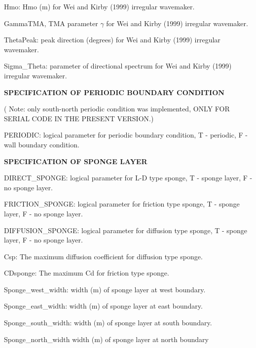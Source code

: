 \documentclass[11pt]{article}
\begin{document}
\begin{description}
\item Hmo: Hmo (m) for Wei and Kirby (1999) irregular wavemaker.

\item GammaTMA, TMA parameter $\gamma$ for Wei and Kirby (1999) irregular wavemaker.

\item ThetaPeak: peak direction (degrees) for Wei and Kirby (1999) irregular wavemaker. 

\item Sigma\_Theta: parameter of directional spectrum for Wei and Kirby (1999) irregular wavemaker.

\item {\bf SPECIFICATION OF PERIODIC BOUNDARY CONDITION} 

( Note: only south-north periodic condition was implemented, ONLY FOR SERIAL CODE IN THE PRESENT VERSION.)

\item PERIODIC: logical parameter for periodic boundary condition, T - periodic, F - wall boundary condition.


\item {\bf SPECIFICATION OF SPONGE LAYER} 
 
 \item DIRECT\_SPONGE: logical parameter for L-D type sponge, T - sponge layer, F - no sponge layer.
 
  \item FRICTION\_SPONGE: logical parameter for friction type sponge, T - sponge layer, F - no sponge layer.
 
  \item DIFFUSION\_SPONGE: logical parameter for diffusion type sponge, T - sponge layer, F - no sponge layer.
 
 \item Csp: The maximum diffusion coefficient for diffusion type sponge.
 
 \item CDsponge: The maximum Cd for friction type sponge.
 
\item Sponge\_west\_width: width (m) of sponge layer at west boundary.

\item Sponge\_east\_width:   width (m) of sponge layer at east boundary.

\item Sponge\_south\_width: width (m) of sponge layer at south boundary.

\item Sponge\_north\_width width (m) of sponge layer at north boundary


\end{description}
\end{document}
